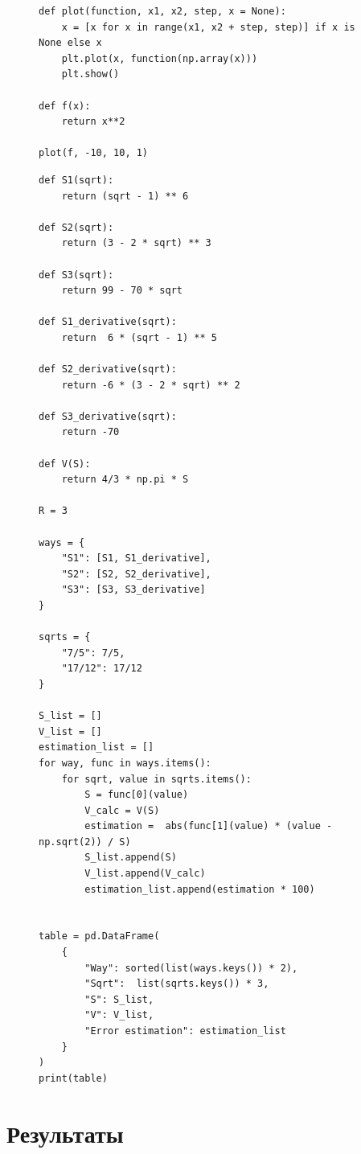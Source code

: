 \documentclass[a4paper, 14pt]{extarticle}
\begin{document}
\begin{figure}[H]
\begin{lstlisting}[language={},caption={Построение графика},label={lst:code3}]
def plot(function, x1, x2, step, x = None):
    x = [x for x in range(x1, x2 + step, step)] if x is None else x
    plt.plot(x, function(np.array(x)))
    plt.show()

def f(x):
    return x**2

plot(f, -10, 10, 1)
\end{lstlisting}
\end{figure}

\begin{figure}[H]
\begin{lstlisting}[language={},caption={Оценка погрешности},label={lst:code4}]
def S1(sqrt):
    return (sqrt - 1) ** 6

def S2(sqrt):
    return (3 - 2 * sqrt) ** 3

def S3(sqrt):
    return 99 - 70 * sqrt

def S1_derivative(sqrt):
    return  6 * (sqrt - 1) ** 5

def S2_derivative(sqrt):
    return -6 * (3 - 2 * sqrt) ** 2

def S3_derivative(sqrt):
    return -70

def V(S):
    return 4/3 * np.pi * S

R = 3

ways = {
    "S1": [S1, S1_derivative],
    "S2": [S2, S2_derivative],
    "S3": [S3, S3_derivative]
}

sqrts = {
    "7/5": 7/5,
    "17/12": 17/12
}

S_list = []
V_list = []
estimation_list = []
for way, func in ways.items():
    for sqrt, value in sqrts.items():
        S = func[0](value)
        V_calc = V(S)
        estimation =  abs(func[1](value) * (value - np.sqrt(2)) / S)
        S_list.append(S)
        V_list.append(V_calc)
        estimation_list.append(estimation * 100)


table = pd.DataFrame(
    {
        "Way": sorted(list(ways.keys()) * 2),
        "Sqrt":  list(sqrts.keys()) * 3,
        "S": S_list,
        "V": V_list,
        "Error estimation": estimation_list
    }
)
print(table)
\end{lstlisting}
\end{figure}

\section{Результаты}
\end{document}
